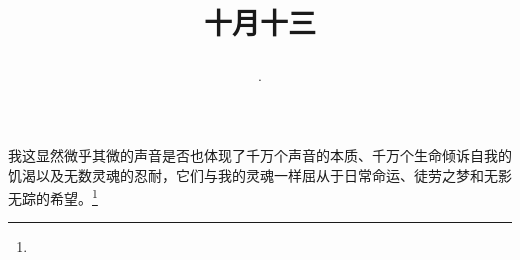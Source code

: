 \title{\date[d=13,m=11,y=2024][year:cn-y,年,month:cn,day:cn,日,·,weekday]·十月十三 }
我这显然微乎其微的声音是否也体现了千万个声音的本质、千万个生命倾诉自我的饥渴以及无数灵魂的忍耐，它们与我的灵魂一样屈从于日常命运、徒劳之梦和无影无踪的希望。\footnote{ }

